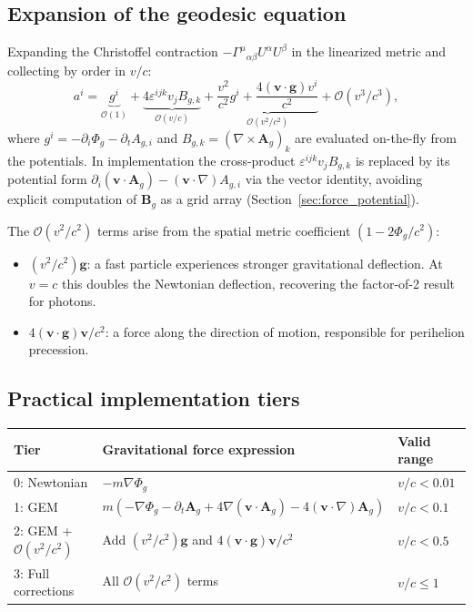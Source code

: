 \documentclass[11pt,a4paper]{article}
\newcommand{\vv}[1]{\mathbf{#1}}
\newcommand{\Phig}{\Phi_g}
\newcommand{\Ag}{\vv{A}_g}
\newcommand{\order}[1]{\mathcal{O}(#1)}
\begin{document}
\subsection{Expansion of the geodesic equation}

Expanding the Christoffel contraction $-\Gamma^\mu{}_{\alpha\beta}U^\alpha U^\beta$ in the linearized metric and collecting by order in $v/c$:
\begin{equation}
\label{eq:geodesic_expansion}
  a^i = \underbrace{g^i}_{\order{1}}
      + \underbrace{4\varepsilon^{ijk}v_j B_{g,k}}_{\order{v/c}}
      + \underbrace{\frac{v^2}{c^2}g^i + \frac{4(\vv{v}\cdot\vv{g})v^i}{c^2}}_{\order{v^2/c^2}}
      + \order{v^3/c^3},
\end{equation}
where $g^i = -\partial_i\Phig - \partial_t A_{g,i}$ and $B_{g,k} = (\nabla\times\Ag)_k$ are evaluated on-the-fly from the potentials.  In implementation the cross-product $\varepsilon^{ijk}v_j B_{g,k}$ is replaced by its potential form $\partial_i(\vv{v}\cdot\Ag) - (\vv{v}\cdot\nabla)A_{g,i}$ via the vector identity, avoiding explicit computation of $\vv{B}_g$ as a grid array (Section~\ref{sec:force_potential}).

The $\order{v^2/c^2}$ terms arise from the spatial metric coefficient $(1-2\Phig/c^2)$:
\begin{itemize}
  \item $(v^2/c^2)\vv{g}$: a fast particle experiences stronger gravitational deflection.  At $v=c$ this doubles the Newtonian deflection, recovering the factor-of-2 result for photons.
  \item $4(\vv{v}\cdot\vv{g})\vv{v}/c^2$: a force along the direction of motion, responsible for perihelion precession.
\end{itemize}

\subsection{Practical implementation tiers}

\begin{center}
\begin{tabular}{@{}lL{7cm}L{2cm}@{}}
\toprule
\textbf{Tier} & \textbf{Gravitational force expression} & \textbf{Valid range} \\
: Newtonian & $-m\nabla\Phig$ & $v/c < 0.01$ \\
1: GEM       & $m(-\nabla\Phig - \partial_t\Ag + 4\nabla(\vv{v}\cdot\Ag) - 4(\vv{v}\cdot\nabla)\Ag)$ & $v/c < 0.1$ \\
2: GEM + $\order{v^2/c^2}$ & Add $(v^2/c^2)\vv{g}$ and $4(\vv{v}\cdot\vv{g})\vv{v}/c^2$ & $v/c < 0.5$ \\
3: Full corrections & All $\order{v^2/c^2}$ terms & $v/c \leq 1$ \\
\bottomrule
\end{tabular}
\end{center}
\end{document}

